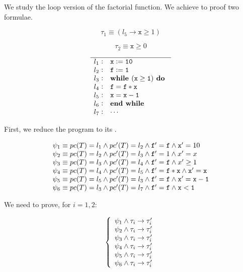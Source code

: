 


We study the loop version of the factorial function. We achieve to proof two formulae.

\[\tau_1 \equiv (l_5 \to \mathtt{x}\geq 1)\]

\[\tau_2 \equiv \mathtt{x} \geq 0\]



\[
	\begin{array}{l@{\hspace{0.3em}}c@{\hspace{1em}}l}
	\hline
		l_1 & : & \mathtt{x := 10} \\
		l_2 & : & \mathtt{f := 1} \\
		l_3 & : & \mathtt{\textbf{while } (x\geq 1) \textbf{ do }} \\
		l_4 & : & \mathtt{	f = f*x} \\
		l_5 & : & \mathtt{	x=x-1} \\ 	
		l_6 & : & \mathtt{\textbf{end while}}\\
		l_7 & : & \mathtt{\cdots}
	\end{array}
\]
\label{simple:example}


First, we reduce the program to its \VC.


\[
	\begin{array}{l}
		 \psi_1 \equiv pc(T) = l_1 \wedge pc'(T) = l_2 \wedge \mathtt{f'=f} \wedge \mathtt{x}' = 10\\
		 \psi_2 \equiv pc(T) = l_2 \wedge pc'(T) = l_3 \wedge \mathtt{f}' = 1 \wedge x'=x\\
		 \psi_3 \equiv pc(T) = l_3 \wedge pc'(T) = l_4 \wedge \mathtt{f'=f} \wedge x'\geq 1\\
		 \psi_4 \equiv pc(T) = l_4 \wedge pc'(T) = l_5 \wedge \mathtt{f}' = \mathtt{f*x} \wedge \mathtt{x'=x}\\
		 \psi_5 \equiv pc(T) = l_5 \wedge pc'(T) = l_3 \wedge \mathtt{f'=f} \wedge \mathtt{x'=x-1}\\
		 \psi_6 \equiv pc(T) = l_3 \wedge pc'(T) = l_7 \wedge \mathtt{f'=f} \wedge \mathtt{x<1}
	\end{array}
\]

We need to prove, for $i=1,2$:

\[
	\left\{
		\begin{array}{l}
			\psi_1 \wedge \tau_i \to \tau_i'\\
			\psi_2 \wedge \tau_i \to \tau_i'\\
			\psi_3 \wedge \tau_i \to \tau_i'\\
			\psi_4 \wedge \tau_i \to \tau_i'\\
			\psi_5 \wedge \tau_i \to \tau_i'\\
			\psi_6 \wedge \tau_i \to \tau_i'\\
		\end{array}
	\right.
\]

